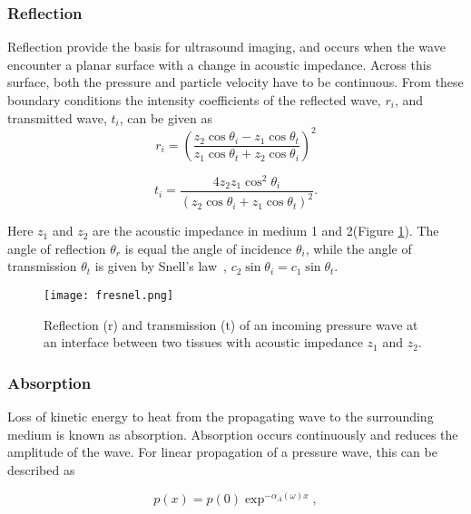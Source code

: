 \subsubsection{Reflection}
Reflection provide the basis for ultrasound imaging, and occurs when the wave encounter a planar surface with a change in acoustic impedance. Across this surface, both the pressure and particle velocity have to be continuous. From these boundary conditions 
the intensity coefficients of the reflected wave, $r_i$, and transmitted wave, $t_i$, can be given as ~\cite{wells1969physical}
\begin{equation}
\label{fresnel}
r_i = \left(\frac{z_2 \cos \theta_i - z_1 \cos \theta_t}{z_1 \cos \theta_t + z_2 \cos \theta_i}\right)^2
\end{equation}

\begin{equation}
\label{fresnel2}
t_i = \frac{4z_2 z_1 \cos^2 \theta_i}{(z_2 \cos \theta_i + z_1 \cos \theta_t)^2}.
\end{equation}

Here $z_1$ and $z_2$ are the acoustic impedance in medium 1 and 2(Figure \ref{Fig:fresnel}). The angle of reflection $\theta_r$ is equal the angle of incidence $\theta_i$, while the angle of transmission $\theta_t$ is given by Snell's law~\cite{blackstock2000fundamentals}, $ c_2 \sin \theta_i = c_1 \sin \theta_t$. 

\begin{figure}[h]
	\centering
	\texttt{[image: fresnel.png]}
	\caption{Reflection (r) and transmission (t) of an incoming pressure wave at an interface between two tissues with acoustic impedance $z_1$ and $z_2$.}
	\label{Fig:fresnel}
\end{figure} 

\subsubsection{Absorption}
Loss of kinetic energy to heat from the propagating wave to the surrounding medium is known as absorption. Absorption occurs continuously and reduces the amplitude of the wave. For linear propagation of a pressure wave, this can be described as 

\begin{equation}
p(x) = p(0)\exp^{-\alpha_A(\omega)x},
\end{equation} 

